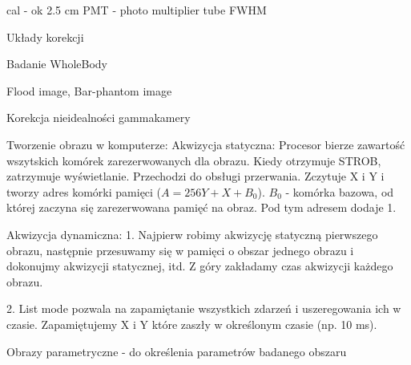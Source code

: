 \documentclass{article}
\begin{document}
cal - ok 2.5 cm
PMT - photo multiplier tube
FWHM

Układy korekcji

Badanie WholeBody

Flood image, Bar-phantom image

Korekcja nieidealności gammakamery

Tworzenie obrazu w komputerze:
Akwizycja statyczna:
Procesor bierze zawartość wszytskich komórek zarezerwowanych dla obrazu. Kiedy otrzymuje STROB, zatrzymuje wyświetlanie. Przechodzi do obsługi przerwania. Zczytuje X i Y i tworzy adres komórki pamięci ($A = 256Y + X + B_0$). $B_0$ - komórka bazowa, od której zaczyna się zarezerwowana pamięć na obraz. Pod tym adresem dodaje 1.

Akwizycja dynamiczna:
1. Najpierw robimy akwizycję statyczną pierwszego obrazu, następnie przesuwamy się w pamięci o obszar jednego obrazu i dokonujmy akwizycji statycznej, itd. Z góry zakładamy czas akwizycji każdego obrazu.

2. List mode pozwala na zapamiętanie wszystkich zdarzeń i uszeregowania ich w czasie. Zapamiętujemy X i Y które zaszły w określonym czasie (np. 10 ms).

Obrazy parametryczne - do określenia parametrów badanego obszaru
\end{document}
